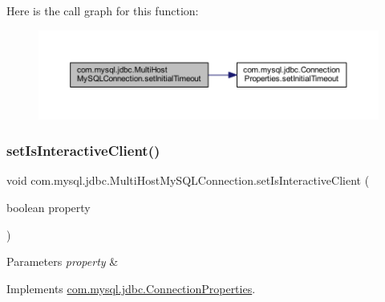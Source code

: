 Here is the call graph for this function\+:
\nopagebreak
\begin{figure}[H]
\begin{center}
\leavevmode
\includegraphics[width=350pt]{classcom_1_1mysql_1_1jdbc_1_1_multi_host_my_s_q_l_connection_aeab355b0e9150013c3690b5be17ea12e_cgraph}
\end{center}
\end{figure}
\mbox{\label{classcom_1_1mysql_1_1jdbc_1_1_multi_host_my_s_q_l_connection_ae0dcc145ddb08238e1cc8af9139af39f}} 
\subsubsection{\texorpdfstring{set\+Is\+Interactive\+Client()}{setIsInteractiveClient()}}
{\footnotesize\ttfamily void com.\+mysql.\+jdbc.\+Multi\+Host\+My\+S\+Q\+L\+Connection.\+set\+Is\+Interactive\+Client (\begin{DoxyParamCaption}\item[{boolean}]{property }\end{DoxyParamCaption})}


\begin{DoxyParams}{Parameters}
{\em property} & \\
\hline
\end{DoxyParams}


Implements \mbox{\hyperlink{interfacecom_1_1mysql_1_1jdbc_1_1_connection_properties_a8157f1dda8d47aca668811bb7c932ec0}{com.\+mysql.\+jdbc.\+Connection\+Properties}}.

